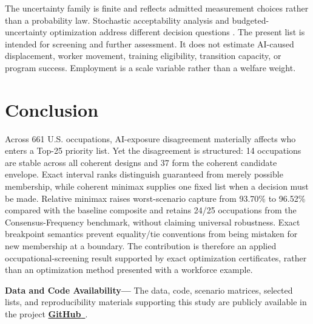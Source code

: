 \documentclass[conference]{IEEEtran}
\begin{document}
The uncertainty family is finite and reflects admitted measurement choices rather than a probability law. Stochastic acceptability analysis and budgeted-uncertainty optimization address different decision questions \cite{lahdelma1998,goerigk2025}. The present list is intended for screening and further assessment. It does not estimate AI-caused displacement, worker movement, training eligibility, transition capacity, or program success. Employment is a scale variable rather than a welfare weight.

\section{Conclusion}
Across 661 U.S. occupations, AI-exposure disagreement materially affects who enters a Top-25 priority list. Yet the disagreement is structured: 14 occupations are stable across all coherent designs and 37 form the coherent candidate envelope. Exact interval ranks distinguish guaranteed from merely possible membership, while coherent minimax supplies one fixed list when a decision must be made. Relative minimax raises worst-scenario capture from 93.70\% to 96.52\% compared with the baseline composite and retains 24/25 occupations from the Consensus-Frequency benchmark, without claiming universal robustness. Exact breakpoint semantics prevent equality/tie conventions from being mistaken for new membership at a boundary. The contribution is therefore an applied occupational-screening result supported by exact optimization certificates, rather than an optimization method presented with a workforce example.

\medskip
\noindent\textbf{Data and Code Availability---} The data, code, scenario matrices, selected lists, and reproducibility materials supporting this study are publicly available in the project \href{https://github.com/shaikhamalkawi-ux/When-AI-Exposure-Rankings-Disagree-Robust-Top-k-Occupational-Selection-under-Uncertainty}{\textbf{GitHub}~\raisebox{0.15ex}{\scriptsize$\nearrow$}}.
\end{document}

